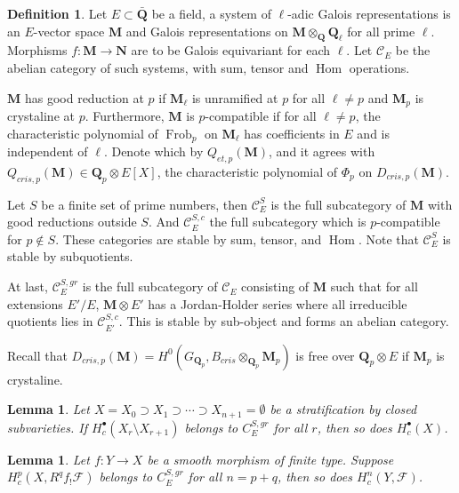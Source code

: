 \documentclass[leqno]{amsart}
\DeclareMathOperator{\Frob}{Frob}
\newcommand{\Q}{{\mathbf{Q}}}
\newcommand{\Qp}{\mathbf{Q}_p}
\newcommand{\1}{\mathbf{1}}
\DeclareMathOperator{\Hom}{Hom}
\newtheorem{lem}[thm]{Lemma}
\theoremstyle{definition}
\newtheorem{defn}[thm]{Definition}
\theoremstyle{remark}
\begin{document}
\begin{defn}
	Let $E\subset \bar{\Q}$ be a field, 
	a system of $\ell$-adic  Galois representations
	is an $E$-vector space  $\mathbf{M}$
	and Galois representations on
	$\mathbf{M}\otimes_\Q\Q_\ell$
	for all prime $\ell$. 
	Morphisms $f\colon \mathbf{M}\to \mathbf{N}$
	are to be Galois equivariant for each $\ell$.
	Let  $\mathcal{C}_E$ be the abelian category
	of such systems,
	with sum, tensor and  $\Hom$ operations. 

	$\mathbf{M}$ has good reduction at  $p$
	if  $\mathbf{M}_\ell$ is unramified at  $p$
	for all  $\ell\neq p$
	and  $\mathbf{M}_p$ is crystaline at  $p$.
	Furthermore,  $\mathbf{M}$ is  $p$-compatible
	if for all  $\ell\neq p$,
	the characteristic polynomial of  $\Frob_p$
	on  $\mathbf{M}_\ell$ has coefficients in  $E$
	and is independent of  $\ell$.
	Denote which by  $Q_{{e}t, p}(\mathbf{M})$,
	and it agrees with 
	$Q_{cris, p}(\mathbf{M})\in \Qp\otimes E[X]$,
	the characteristic polynomial of $\Phi_p$
	on  $D_{cris,p}(\mathbf{M})$.

	Let $S$ be a finite set of prime numbers, 
	then  $\mathcal{C}_E^S$
	is the full subcategory of  $\mathbf{M}$
	with good reductions outside  $S$. 
	And  $\mathcal{C}_E^{S,c}$
	the full subcategory 
	which is $p$-compatible for  $p\notin S$.
	These categories are stable
	by  sum, tensor, and  $\Hom$.
	Note that  $\mathcal{C}_E^S$
	is stable by subquotients.

	At last,  $\mathcal{C}_E^{S,gr}$ 
	is the full subcategory of $\mathcal{C}_E$
	consisting of  $\mathbf{M}$
	such that for all extensions  $E'/E$,
	$\mathbf{M}\otimes E'$ has a Jordan-Holder series
	where all irreducible quotients lies in 
	$\mathcal{C}_{E'}^{S,c}$.
	This is stable by sub-object and forms
	an abelian category.
\end{defn}
Recall that $D_{cris,p}(\mathbf{M})
=H^0(G_{\Qp},B_{cris}\otimes_{\Qp}\mathbf{M}_p)$
is free over $\Qp\otimes E$
if  $\mathbf{M}_p$ is crystaline.

\begin{lem}
	Let 
	$X=X_0\supset X_1\supset\cdots\supset X_{n+1}=\emptyset$
	be a stratification by closed subvarieties.
	If $H^\bullet_c(X_r\setminus X_{r+1})$
	belongs to $C_E^{S,gr}$ for all $r$,
	then so does $H^\bullet_c(X)$.
\end{lem}
\begin{lem}
	Let $f\colon Y\to X$ 
	be a smooth morphism of finite type.
	Suppose  $H^p_c(X, R^qf_!\mathcal{F})$
	belongs to $C_E^{S,gr}$ for all $n=p+q$,
	then so does $H^n_c(Y, \mathcal{F})$.
\end{lem}
\end{document}
